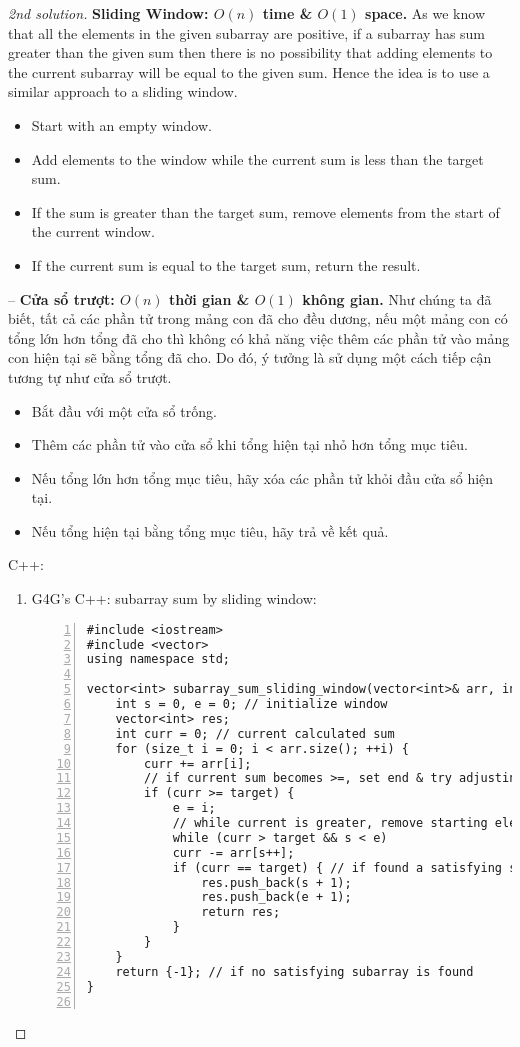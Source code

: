 \documentclass{article}
\begin{document}
\begin{proof}[2nd solution]
    {\bf Sliding Window: $O(n)$ time \& $O(1)$ space.} As we know that all the elements in the given subarray are positive, if a subarray has sum greater than the given sum then there is no possibility that adding elements to the current subarray will be equal to the given sum. Hence the idea is to use a similar approach to a sliding window.
    \begin{itemize}
        \item Start with an empty window.
        \item Add elements to the window while the current sum is less than the target sum.
        \item If the sum is greater than the target sum, remove elements from the start of the current window.
        \item If the current sum is equal to the target sum, return the result.
    \end{itemize}
    -- {\bf Cửa sổ trượt: $O(n)$ thời gian \& $O(1)$ không gian.} Như chúng ta đã biết, tất cả các phần tử trong mảng con đã cho đều dương, nếu một mảng con có tổng lớn hơn tổng đã cho thì không có khả năng việc thêm các phần tử vào mảng con hiện tại sẽ bằng tổng đã cho. Do đó, ý tưởng là sử dụng một cách tiếp cận tương tự như cửa sổ trượt.
    \begin{itemize}
        \item Bắt đầu với một cửa sổ trống.
        \item Thêm các phần tử vào cửa sổ khi tổng hiện tại nhỏ hơn tổng mục tiêu.
        \item Nếu tổng lớn hơn tổng mục tiêu, hãy xóa các phần tử khỏi đầu cửa sổ hiện tại.
        \item Nếu tổng hiện tại bằng tổng mục tiêu, hãy trả về kết quả.
    \end{itemize}
    C++:
    \begin{enumerate}
        \item G4G's C++: subarray sum by sliding window:
        \begin{Verbatim}[numbers=left,xleftmargin=5mm]
#include <iostream>
#include <vector>
using namespace std;

vector<int> subarray_sum_sliding_window(vector<int>& arr, int target) {
    int s = 0, e = 0; // initialize window
    vector<int> res;
    int curr = 0; // current calculated sum
    for (size_t i = 0; i < arr.size(); ++i) {
        curr += arr[i];
        // if current sum becomes >=, set end & try adjusting start
        if (curr >= target) {
            e = i;
            // while current is greater, remove starting elements of current window
            while (curr > target && s < e)
            curr -= arr[s++];
            if (curr == target) { // if found a satisfying subarray
                res.push_back(s + 1);
                res.push_back(e + 1);
                return res;
            }
        }
    }
    return {-1}; // if no satisfying subarray is found
}


\end{Verbatim}
\end{enumerate}
\end{proof}
\end{document}
